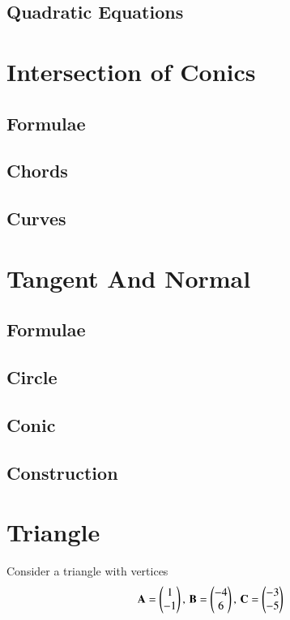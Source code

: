\documentclass[journal]{IEEEtran}
\begin{document}
\subsection{Quadratic Equations}

\newpage
\section{Intersection of Conics}
\subsection{Formulae}

\subsection{Chords}

\subsection{Curves}


\newpage
\section{Tangent And Normal}
\subsection{Formulae}

\subsection{Circle}

\subsection{Conic}

\subsection{Construction}

%
\appendices
\section{Triangle}
Consider a triangle with vertices
		\begin{align}
			\label{eq:app-tri-pts}
			\mathbf{A} = \begin{pmatrix}1 \\ -1\end{pmatrix},\,
			\mathbf{B} = \begin{pmatrix}-4 \\ 6\end{pmatrix},\,
			\mathbf{C} = \begin{pmatrix}-3 \\ -5\end{pmatrix}
		\end{align}
\end{document}

